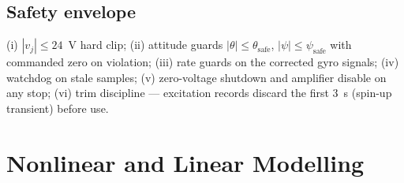 \documentclass[conference]{IEEEtran}
\begin{document}
\subsection{Safety envelope}\label{sec:safety}
(i) $|v_j|\le24$~V hard clip; (ii) attitude guards $|\theta|\le\theta_{\mathrm{safe}}$, $|\psi|\le\psi_{\mathrm{safe}}$ with commanded zero on violation; (iii) rate guards on the corrected gyro signals; (iv) watchdog on stale samples; (v) zero-voltage shutdown and amplifier disable on any stop; (vi) trim discipline --- excitation records discard the first 3~s (spin-up transient) before use.

\section{Nonlinear and Linear Modelling}\label{sec:model}
\end{document}
